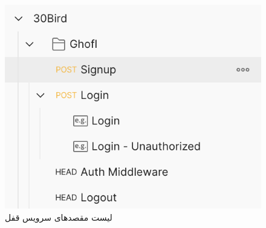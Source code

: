 \begin{figure}
	\vspace{1cm}
	\centering
	\includegraphics[scale=0.7]{figures/ghofl-api.png}
	\caption{لیست مقصدهای سرویس قفل}
	\label{fig:ghofl-api}
\end{figure}


